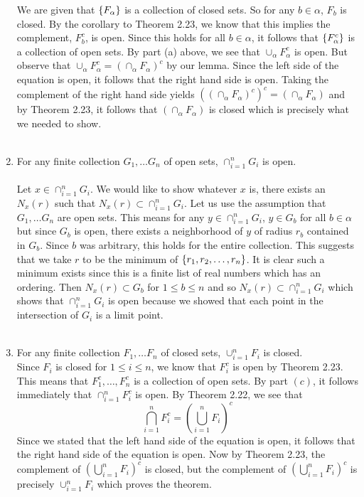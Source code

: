 \documentclass[12pt]{article}
\begin{document}
\begin{enumerate}
We are given that $\left\{F_{\alpha}\right\}$ is a collection of closed sets. So for any $b \in \alpha$, $F_{b}$ is closed. By the corollary to Theorem 2.23, we know that this implies the complement, $F_{b}^{c}$, is open. Since this holds for all $b \in \alpha$, it follows that $\left\{F_{\alpha}^{c}\right\}$ is a collection of open sets. By part (a) above, we see that $\cup_{\alpha} F_{\alpha}^{c}$ is open. But observe that  $\cup_{\alpha} F_{\alpha}^{c} = (\cap_{\alpha} F_{\alpha})^{c}$ by our lemma. Since the left side of the equation is open, it follows that the right hand side is open. Taking the complement of the right hand side yields $( (\cap_{\alpha} F_{\alpha})^{c})^{c}=(\cap_{\alpha} F_{\alpha})$ and by Theorem 2.23, it follows that $(\cap_{\alpha} F_{\alpha})$ is closed which is precisely what we needed to show. \\ \\

\item For any finite collection $G_{1}, \ldots G_{n}$ of open sets, $\cap^{n}_{i=1}G_{i}$ is open. \\ \\
Let $x \in \cap^{n}_{i=1}G_{i}$. We would like to show whatever $x$ is, there exists an $N_{x}(r)$ such that   $N_{x}(r) \subset \cap^{n}_{i=1}G_{i}$. Let us use the assumption that $G_{1}, \ldots G_{n}$ are open sets. This means for any $y \in \cap^{n}_{i=1}G_{i}$, $y \in G_{b}$ for all $b \in \alpha$ but since  $G_{b}$ is open, there exists a neighborhood of $y$ of radius $r_{b}$  contained in $G_{b}$. Since $b$ was arbitrary, this holds for the entire collection. This suggests that we take $r$ to be the minimum of $\left\{r_{1}, r_{2}, \ldots, r_{n}\right\}$.  It is clear such a minimum exists since this is a finite list of real numbers which has an ordering. Then $N_{x}(r) \subset G_{b}$ for $1 \leq b \leq n$ and so $N_{x}(r) \subset \cap^{n}_{i=1}G_{i}$ which shows that $\cap^{n}_{i=1}G_{i}$  is open because we showed that each point in the intersection of $G_{i}$ is a limit point. \\ \\ 

\item For any finite collection $F_{1}, \ldots F_{n}$ of closed sets, $\cup^{n}_{i=1}F_{i}$ is closed. \\ 

Since $F_{i}$ is closed for $1 \leq i \leq n$, we know that $F_{i}^{c}$ is open by Theorem 2.23. This means that $F_{1}^{c}, \ldots, F_{n}^{c}$ is a collection of open sets. By part $(c)$, it follows immediately that $\cap^{n}_{i=1} F_{i}^{c}$ is open. By Theorem 2.22, we see that  \begin{equation}
\bigcap^{n}_{i=1} F_{i}^{c} = \left(\bigcup_{i=1}^{n} F_{i} \right)^{c}
\end{equation}
Since we stated that the left hand side of the equation is open, it follows that the right hand side of the equation is open. Now by Theorem 2.23, the complement of $(\bigcup_{i=1}^{n} F_{i})^{c}$ is closed, but the complement of $(\bigcup_{i=1}^{n} F_{i})^{c}$ is precisely $\cup^{n}_{i=1}F_{i}$ which proves the theorem. \\ \\


\end{enumerate}
\end{document}
